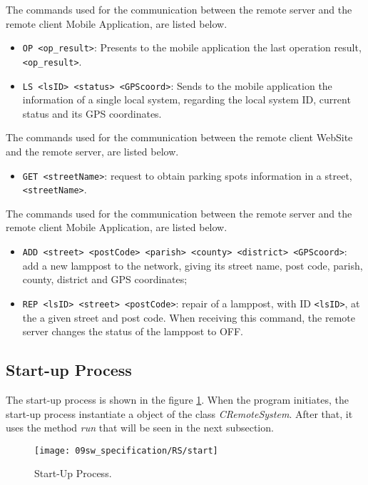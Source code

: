 \clearpage
The commands used for the communication between the remote server and the remote client Mobile Application, are listed below.
\begin{itemize}
	\item \verb|OP <op_result>|: Presents to the mobile application the last operation result, \verb|<op_result>|.
	
	\item \verb|LS <lsID> <status> <GPScoord>|: Sends to the mobile application the information of a single local system, regarding the local system ID, current status and its GPS coordinates.
\end{itemize}

The commands used for the communication between the remote client WebSite and the remote server, are listed below.
\begin{itemize}
	\item \verb|GET <streetName>|: request to obtain parking spots information in a street, \verb|<streetName>|.
\end{itemize}

The commands used for the communication between the remote server and the remote client Mobile Application, are listed below.
\begin{itemize}
	\item \verb|ADD <street> <postCode> <parish> <county> <district> <GPScoord>|: add a new lamppost to the network, giving its street name, post code, parish, county, district and GPS coordinates;
	\item \verb|REP <lsID> <street> <postCode>|: repair of a lamppost, with ID \verb|<lsID>|, at the a given street and post code. When receiving this command, the remote server changes the status of the lamppost to OFF.
\end{itemize}

\clearpage
\subsection{Start-up Process}
The start-up process is shown in the figure \ref{fig:RSstart}. When the program initiates, the start-up process instantiate a object of the class \textit{CRemoteSystem}. After that, it uses the method \textit{run} that will be seen in the next subsection.

\begin{figure}[H]
	\centering
	\texttt{[image: 09sw\_specification/RS/start]}
	\caption{Start-Up Process.}
	\label{fig:RSstart}
\end{figure}

